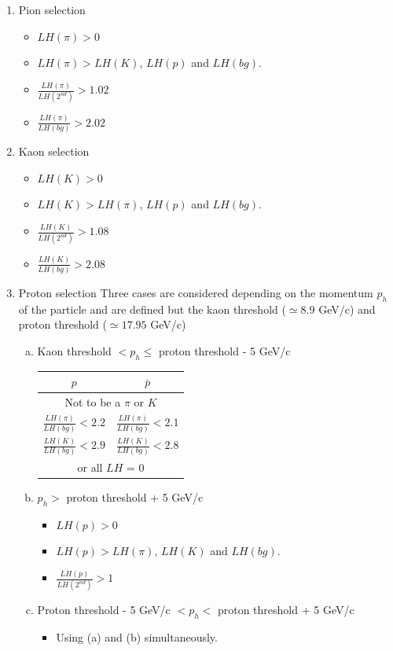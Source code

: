 \begin{enumerate}
  \item Pion selection
  \begin{itemize}
    \item $LH(\pi) > 0$
    \item $LH(\pi) > LH(K)$, $LH(p)$ and $LH(bg)$.
    \item $\frac{LH(\pi)}{LH(2^{nd})}>1.02$
    \item $\frac{LH(\pi)}{LH(bg)}>2.02$
  \end{itemize}
  \item Kaon selection
  \begin{itemize}
    \item $LH(K) > 0$
    \item $LH(K) > LH(\pi)$, $LH(p)$ and $LH(bg)$.
    \item $\frac{LH(K)}{LH(2^{nd})}>1.08$
    \item $\frac{LH(K)}{LH(bg)}>2.08$
  \end{itemize}
  \item Proton selection
  Three cases are considered depending on the momentum $p_{h}$ of the particle and are defined but the kaon threshold ($\simeq 8.9$ GeV/c)
  and proton threshold ($\simeq 17.95$ GeV/c)
  \begin{enumerate}[(a)]
    \item Kaon threshold $< p_{h} \leq$ proton threshold - 5 GeV/c
	  \begin{center}
		  \begin{tabular}{c|c}
		    \hline
		     $p$ & $\bar{p}$ \\
		    \hline
				\multicolumn{2}{c}{Not to be a $\pi$ or $K$} \\
		    $\frac{LH(\pi)}{LH(bg)} < 2.2$ & $\frac{LH(\pi)}{LH(bg)} < 2.1$ \\
		    $\frac{LH(K)}{LH(bg)} < 2.9$ & $\frac{LH(K)}{LH(bg)} < 2.8$ \\
		    \hline
				\multicolumn{2}{c}{or all $LH$ = 0} \\
				\hline
		  \end{tabular}
		\end{center}
    \item $p_{h} >$ proton threshold + 5 GeV/c
    \begin{itemize}
      \item $LH(p) > 0$
      \item $LH(p) > LH(\pi)$, $LH(K)$ and $LH(bg)$.
      \item $\frac{LH(p)}{LH(2^{nd})}>1$
    \end{itemize}
    \item Proton threshold - 5 GeV/c $< p_{h} <$ proton threshold + 5 GeV/c
    \begin{itemize}
      \item Using (a) and (b) simultaneously.
    \end{itemize}
  \end{enumerate}
\end{enumerate}

